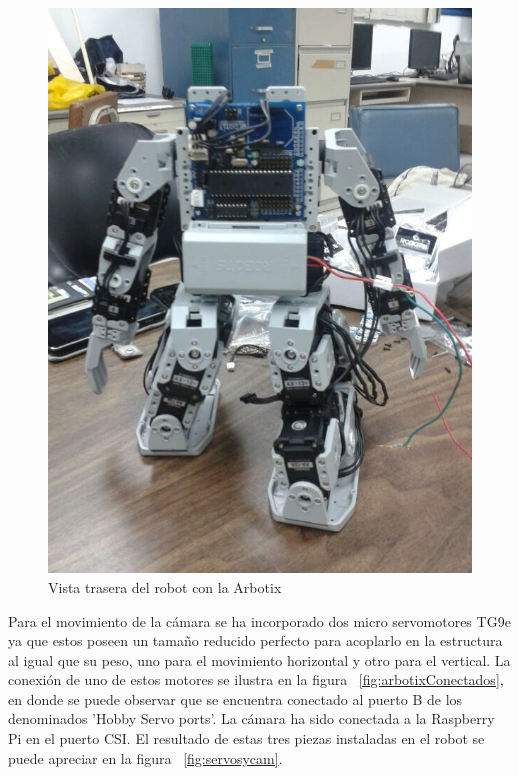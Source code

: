 \begin{figure}[hbtp]
\centering
\includegraphics[scale=0.2]{imagenes/traseroDeJunny.jpg}
\caption{Vista trasera del robot con la Arbotix}
\label{fig:trasera2}
\end{figure}


Para el movimiento de la cámara se ha incorporado dos micro servomotores TG9e ya que estos poseen un tama\~no reducido perfecto para acoplarlo en la estructura al igual que su peso, uno para el movimiento horizontal y otro para el vertical. La conexión de uno de estos motores se ilustra en la figura ~\ref{fig:arbotixConectados}, en donde se puede observar que se encuentra conectado al puerto B de los denominados 'Hobby Servo ports'. La cámara ha sido conectada a la Raspberry Pi en el puerto CSI. El resultado de estas tres piezas instaladas en el robot se puede apreciar en la figura ~\ref{fig:servosycam}.


